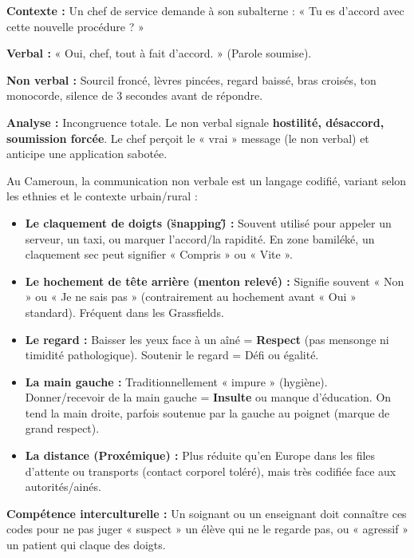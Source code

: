 \documentclass[11pt]{article}
\begin{document}
\begin{exemplebox}
\textbf{Contexte :} Un chef de service demande à son subalterne : « Tu es d'accord avec cette nouvelle procédure ? »\par
\textbf{Verbal :} « Oui, chef, tout à fait d'accord. » (Parole soumise).\par
\textbf{Non verbal :} Sourcil froncé, lèvres pincées, regard baissé, bras croisés, ton monocorde, silence de 3 secondes avant de répondre.\par
\textbf{Analyse :} Incongruence totale. Le non verbal signale \textbf{hostilité, désaccord, soumission forcée}. Le chef perçoit le « vrai » message (le non verbal) et anticipe une application sabotée.
\end{exemplebox}

\begin{savaistu}
Au Cameroun, la communication non verbale est un langage codifié, variant selon les ethnies et le contexte urbain/rural :
\begin{itemize}
\item \textbf{Le claquement de doigts (\"snapping\") :} Souvent utilisé pour appeler un serveur, un taxi, ou marquer l'accord/la rapidité. En zone bamiléké, un claquement sec peut signifier « Compris » ou « Vite ».
\item \textbf{Le hochement de tête arrière (menton relevé) :} Signifie souvent « Non » ou « Je ne sais pas » (contrairement au hochement avant « Oui » standard). Fréquent dans les Grassfields.
\item \textbf{Le regard :} Baisser les yeux face à un aîné = \textbf{Respect} (pas mensonge ni timidité pathologique). Soutenir le regard = Défi ou égalité.
\item \textbf{La main gauche :} Traditionnellement « impure » (hygiène). Donner/recevoir de la main gauche = \textbf{Insulte} ou manque d'éducation. On tend la main droite, parfois soutenue par la gauche au poignet (marque de grand respect).
\item \textbf{La distance (Proxémique) :} Plus réduite qu'en Europe dans les files d'attente ou transports (contact corporel toléré), mais très codifiée face aux autorités/ainés.
\end{itemize}
\textbf{Compétence interculturelle :} Un soignant ou un enseignant doit connaître ces codes pour ne pas juger « suspect » un élève qui ne le regarde pas, ou « agressif » un patient qui claque des doigts.
\end{savaistu}
\end{document}
